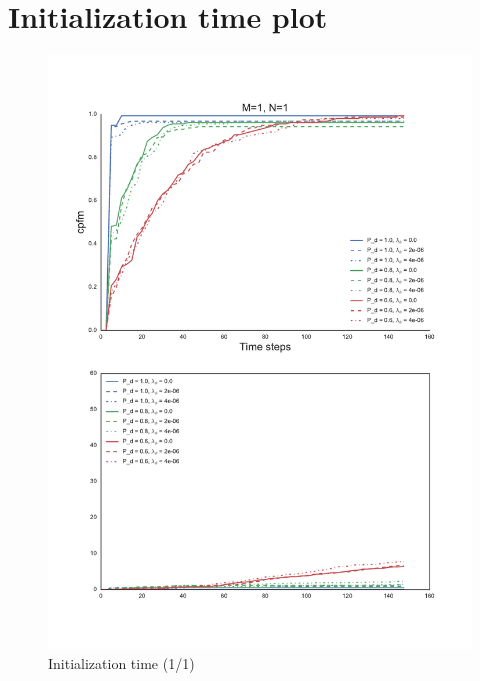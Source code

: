 
\chapter{Initialization time plot}

\begin{figure}[H]
\centering
\includegraphics[height = .9\textheight]{Figures/plots/Scenario1_Init-Time(1-1).pdf}
\caption{Initialization time (1/1)}\label{fig:init_time_1-1}
\end{figure}

